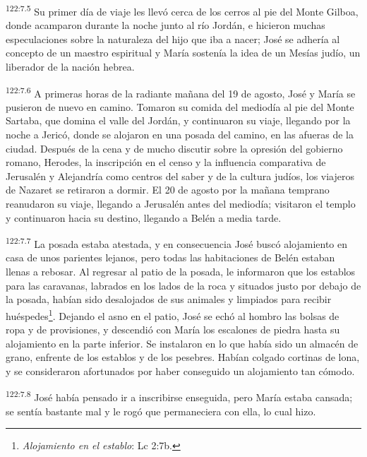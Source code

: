 \par
\textsuperscript{122:7.5} Su primer día de viaje les llevó cerca de los cerros al pie del Monte Gilboa, donde acamparon durante la noche junto al río Jordán, e hicieron muchas especulaciones sobre la naturaleza del hijo que iba a nacer; José se adhería al concepto de un maestro espiritual y María sostenía la idea de un Mesías judío, un liberador de la nación hebrea.

\par
\textsuperscript{122:7.6} A primeras horas de la radiante mañana del 19 de agosto, José y María se pusieron de nuevo en camino. Tomaron su comida del mediodía al pie del Monte Sartaba, que domina el valle del Jordán, y continuaron su viaje, llegando por la noche a Jericó, donde se alojaron en una posada del camino, en las afueras de la ciudad. Después de la cena y de mucho discutir sobre la opresión del gobierno romano, Herodes, la inscripción en el censo y la influencia comparativa de Jerusalén y Alejandría como centros del saber y de la cultura judíos, los viajeros de Nazaret se retiraron a dormir. El 20 de agosto por la mañana temprano reanudaron su viaje, llegando a Jerusalén antes del mediodía; visitaron el templo y continuaron hacia su destino, llegando a Belén a media tarde.

\par
\textsuperscript{122:7.7} La posada estaba atestada, y en consecuencia José buscó alojamiento en casa de unos parientes lejanos, pero todas las habitaciones de Belén estaban llenas a rebosar. Al regresar al patio de la posada, le informaron que los establos para las caravanas, labrados en los lados de la roca y situados justo por debajo de la posada, habían sido desalojados de sus animales y limpiados para recibir huéspedes\footnote{\textit{Alojamiento en el establo}: Lc 2:7b.}. Dejando el asno en el patio, José se echó al hombro las bolsas de ropa y de provisiones, y descendió con María los escalones de piedra hasta su alojamiento en la parte inferior. Se instalaron en lo que había sido un almacén de grano, enfrente de los establos y de los pesebres. Habían colgado cortinas de lona, y se consideraron afortunados por haber conseguido un alojamiento tan cómodo.

\par
\textsuperscript{122:7.8} José había pensado ir a inscribirse enseguida, pero María estaba cansada; se sentía bastante mal y le rogó que permaneciera con ella, lo cual hizo.

